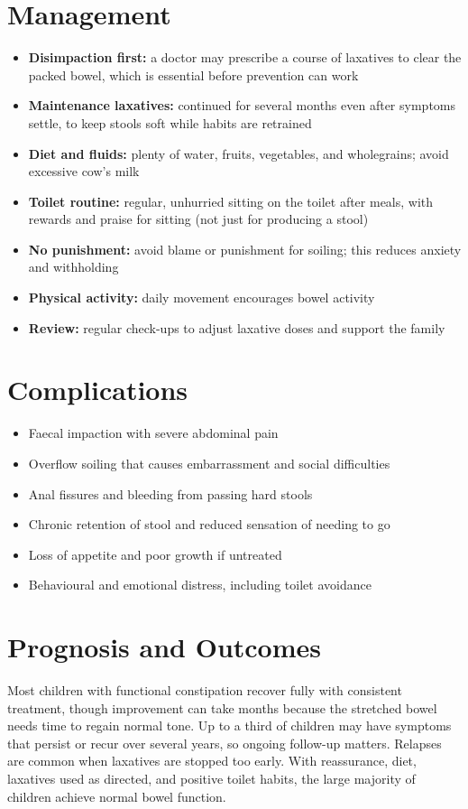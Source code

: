 \section*{Management}
\begin{itemize}
    \item \textbf{Disimpaction first:} a doctor may prescribe a course of laxatives to clear the packed bowel, which is essential before prevention can work
    \item \textbf{Maintenance laxatives:} continued for several months even after symptoms settle, to keep stools soft while habits are retrained
    \item \textbf{Diet and fluids:} plenty of water, fruits, vegetables, and wholegrains; avoid excessive cow's milk
    \item \textbf{Toilet routine:} regular, unhurried sitting on the toilet after meals, with rewards and praise for sitting (not just for producing a stool)
    \item \textbf{No punishment:} avoid blame or punishment for soiling; this reduces anxiety and withholding
    \item \textbf{Physical activity:} daily movement encourages bowel activity
    \item \textbf{Review:} regular check-ups to adjust laxative doses and support the family
\end{itemize}

\section*{Complications}
\begin{itemize}
    \item Faecal impaction with severe abdominal pain
    \item Overflow soiling that causes embarrassment and social difficulties
    \item Anal fissures and bleeding from passing hard stools
    \item Chronic retention of stool and reduced sensation of needing to go
    \item Loss of appetite and poor growth if untreated
    \item Behavioural and emotional distress, including toilet avoidance
\end{itemize}

\section*{Prognosis and Outcomes}
Most children with functional constipation recover fully with consistent treatment, though improvement can take months because the stretched bowel needs time to regain normal tone. Up to a third of children may have symptoms that persist or recur over several years, so ongoing follow-up matters. Relapses are common when laxatives are stopped too early. With reassurance, diet, laxatives used as directed, and positive toilet habits, the large majority of children achieve normal bowel function.

